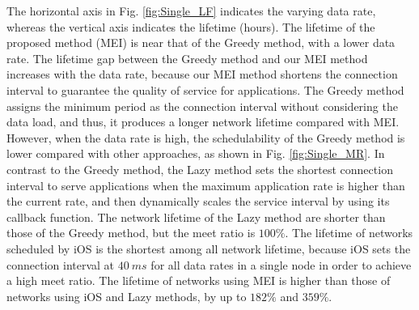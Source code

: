 \documentclass[10pt,journal,compsoc]{IEEEtran}
\begin{document}
The horizontal axis in Fig. \ref{fig:Single_LF} indicates the varying data rate, whereas the vertical axis indicates the lifetime (hours).
The lifetime of the proposed method (MEI) is near that of the Greedy method, with a lower data rate. The lifetime gap between the Greedy method and our MEI method increases with the data rate, because our MEI method shortens the connection interval to guarantee the quality of service for applications. The Greedy method assigns the minimum period as the connection interval without considering the data load, and thus, it produces a longer network lifetime compared with MEI. However, when the data rate is high, the schedulability of the Greedy method is lower compared with other approaches, as shown in Fig. \ref{fig:Single_MR}. In contrast to the Greedy method, the Lazy method sets the shortest connection interval to serve applications when the maximum application rate is higher than the current rate, and then dynamically scales the service interval by using its callback function. The network lifetime of the Lazy method are shorter than those of the Greedy method, but the meet ratio is $100\%$. The lifetime of networks scheduled by iOS is the shortest among all network lifetime, because iOS sets the connection interval at $40~ms$ for all data rates in a single node in order to achieve a high meet ratio. The lifetime of networks using MEI is higher than those of networks using iOS and Lazy methods, by up to $182\%$ and $359\%$.



\end{document}
